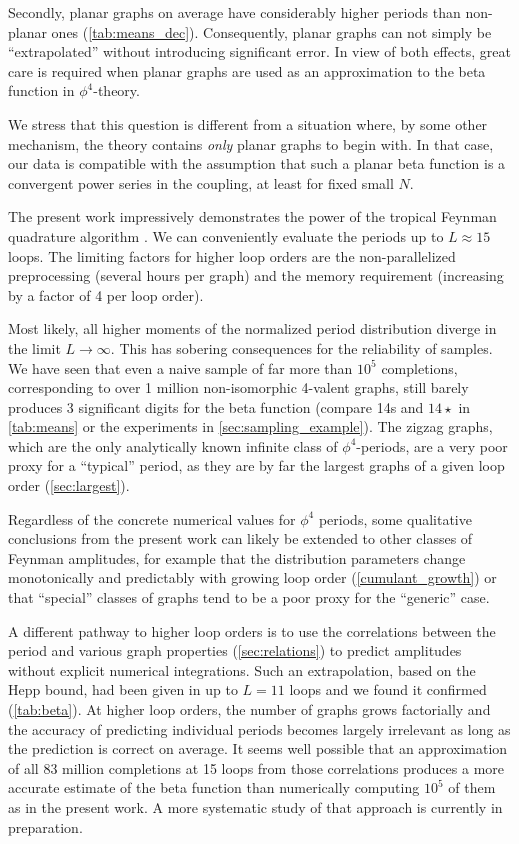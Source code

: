 \documentclass[11pt,a4paper]{article}
\renewcommand{\|}{\rule[-0.4ex]{0.2ex}{1.2em}}
\begin{document}
Secondly, planar graphs on average have considerably higher periods than non-planar ones (\cref{tab:means_dec}). Consequently, planar graphs can not simply be \enquote{extrapolated}  without introducing significant error. In view of both effects, great care is required when planar graphs are used as an approximation to the beta function in $\phi^4$-theory. 

We stress that this question is different from a situation where, by some other mechanism, the theory contains \emph{only} planar graphs to begin with. In that case, our  data is compatible with the assumption that such a planar beta function is a convergent power series in the coupling, at least for fixed small $N$.


The present work impressively demonstrates the power of the tropical Feynman quadrature algorithm \cite{borinsky_tropical_2023a,borinsky_tropical_2023}. We can conveniently evaluate the periods up to   $L\approx 15$ loops. The limiting factors for higher loop orders are the non-parallelized preprocessing (several hours per graph) and the memory requirement (increasing by a factor of 4 per loop order). 


Most likely, all higher moments of the normalized period distribution diverge in the limit $L \rightarrow \infty$. 
This has sobering consequences for the reliability of samples. We have seen that even a naive sample of far more than $10^5$ completions, corresponding to over 1 million non-isomorphic 4-valent graphs, still barely produces 3 significant digits for the beta function (compare 14s and $14\star$ in \cref{tab:means} or the experiments in \cref{sec:sampling_example}). The zigzag graphs, which are the only analytically known infinite class of $\phi^4$-periods, are a very poor proxy for a \enquote{typical} period, as they are by far the largest graphs of a given loop order (\cref{sec:largest}).

Regardless of the concrete numerical values for $\phi^4$ periods, some qualitative conclusions from the present work can likely be extended to other classes of Feynman amplitudes, for example that the distribution parameters change monotonically and predictably with growing loop order (\cref{cumulant_growth}) or that \enquote{special} classes of graphs tend to be a poor proxy for the \enquote{generic} case.

A different pathway to higher loop orders is to use the correlations between the period and various graph properties (\cref{sec:relations}) to predict amplitudes without  explicit numerical integrations. Such an extrapolation, based on the Hepp bound, had been given in \cite{kompaniets_minimally_2017} up to $L=11$ loops  and we found it confirmed (\cref{tab:beta}). At higher loop orders, the number of graphs grows factorially and the accuracy of predicting individual periods becomes largely irrelevant as long as the prediction is correct on average.  It seems well possible that an approximation of all 83 million completions at 15 loops from those correlations produces a more accurate estimate of the beta function than numerically computing $10^5$ of them as in  the present work. A more systematic study of that approach is currently in preparation.
\end{document}
